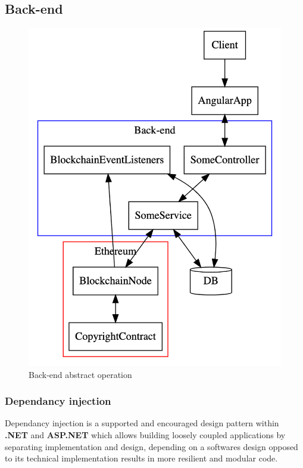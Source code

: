 \subsection{Back-end}

\begin{figure}[H]
\caption{Back-end abstract operation}
\centering
\includegraphics[width=\textwidth,height=0.4\textheight,keepaspectratio]{images/operational/example-backend}
\centering
\end{figure}

\subsubsection{Dependancy injection}

Dependancy injection is a supported and encouraged design pattern within \textbf{.NET} and \textbf{ASP.NET} which allows building loosely coupled applications by separating implementation and design, depending on a softwares design opposed to its technical implementation results in more resilient and modular code.

